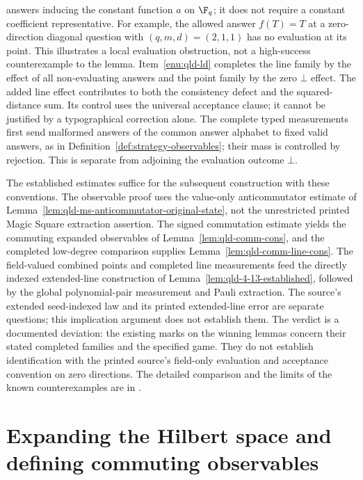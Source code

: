 \begin{remark}
	answers inducing the constant function $a$ on $\F_q$; it does not require
	a constant coefficient representative. For example, the allowed answer
	$f(T)=T$ at a zero-direction diagonal question with
	$(q,m,d)=(2,1,1)$ has no evaluation at its point. This illustrates a local
	evaluation obstruction, not a high-success counterexample to the lemma.
	Item~\ref{enu:qld-ld} completes the line family by the effect of all
	non-evaluating answers and the point family by the zero $\bot$ effect.
	The added line effect contributes to both the consistency defect and
	the squared-distance sum. Its control uses the universal acceptance
	clause; it cannot be justified by a typographical correction alone.
	The complete typed measurements first send malformed answers of the
	common answer alphabet to fixed valid answers, as in
	Definition~\ref{def:strategy-observables}; their mass is controlled by
	rejection. This is separate from adjoining the evaluation outcome $\bot$.

	The established estimates suffice for the subsequent construction with
	these conventions. The observable proof uses the value-only
	anticommutator estimate of
	Lemma~\ref{lem:qld-ms-anticommutator-original-state}, not the unrestricted
	printed Magic Square extraction assertion. The signed commutation estimate
	yields the commuting expanded observables of Lemma~\ref{lem:qld-comm-cons},
	and the completed low-degree comparison supplies
	Lemma~\ref{lem:qld-comm-line-cons}. The field-valued combined points and
	completed line measurements feed the directly indexed extended-line
	construction of Lemma~\ref{lem:qld-4-13-established}, followed by the
	global polynomial-pair measurement and Pauli extraction. The source's
	extended seed-indexed law and its printed extended-line error are separate
	questions; this implication argument does not establish them.
	The verdict is a documented deviation: the existing marks on the winning
	lemmas concern their stated completed families and the specified game.
	They do not establish identification with the printed source's
	field-only evaluation and acceptance convention on zero directions. The
	detailed comparison and the limits of the known counterexamples are in
	\cite{gap:qpbt_win-implications-corrections}.
\end{remark}

\section{Expanding the Hilbert space and defining commuting observables}
\label{sec:expanding}

